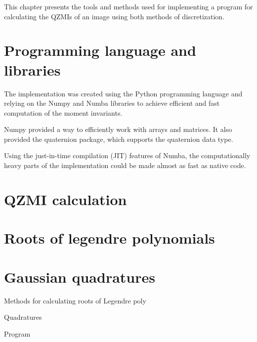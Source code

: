 This chapter presents the tools and methods used for implementing a program for calculating the QZMIs of an image using both methods of discretization.

\section{Programming language and libraries}
The implementation was created using the Python programming language and relying on the Numpy and Numba libraries to achieve efficient and fast computation of the moment invariants.

Numpy provided a way to efficiently work with arrays and matrices. It also provided the quaternion package, which supports the quaternion data type.

Using the just-in-time compilation (JIT) features of Numba, the computationally heavy parts of the implementation could be made almost as fast as native code.

\section{QZMI calculation}

\section{Roots of legendre polynomials}

\section{Gaussian quadratures}



Methods for calculating roots of Legendre poly

Quadratures

Program